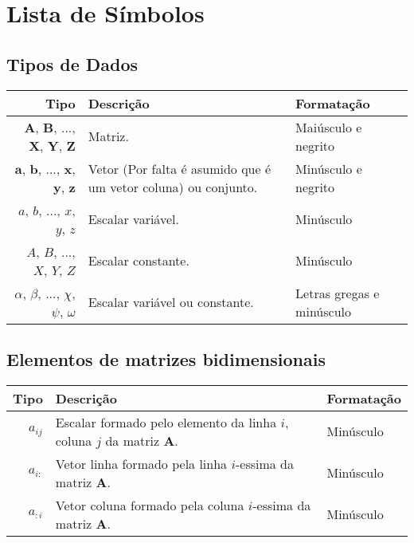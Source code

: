 \chapter*{Lista de Símbolos}

\singlespacing

\section*{Tipos de Dados}
\begin{tabular}{r | p{.45\linewidth} | l}
\hline	
Tipo & Descrição & Formatação \\ \hline
$\mathbf{A}$, $\mathbf{B}$, ..., $\mathbf{X}$, $\mathbf{Y}$, $\mathbf{Z}$& Matriz. & Maiúsculo e negrito \\
$\mathbf{a}$, $\mathbf{b}$, ..., $\mathbf{x}$, $\mathbf{y}$, $\mathbf{z}$ & Vetor (Por falta é asumido que é um vetor coluna) ou conjunto. & Minúsculo e negrito \\
$a$, $b$, ..., $x$, $y$, $z$ & Escalar variável. & Minúsculo \\
$A$, $B$, ..., $X$, $Y$, $Z$ & Escalar constante. & Minúsculo \\
$\alpha$, $\beta$, ..., $\chi$, $\psi$, $\omega$ & Escalar variável ou constante. & Letras gregas e minúsculo  \\ \hline
\end{tabular}

\section*{Elementos de matrizes bidimensionais}
\begin{tabular}{r | p{.55\linewidth} | l}
\hline	
Tipo & Descrição & Formatação \\ \hline
$a_{ij}$ & Escalar formado pelo elemento da linha $i$, coluna $j$ da matriz $\mathbf{A}$. & Minúsculo \\ \hline
$a_{i:}$ & Vetor linha formado pela linha $i$-essima da matriz $\mathbf{A}$.  & Minúsculo \\
$a_{:i}$ & Vetor coluna formado pela coluna $i$-essima da matriz $\mathbf{A}$.  & Minúsculo \\
\end{tabular}

